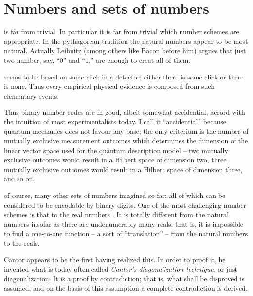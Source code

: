 \begin{center}
{\color{olive}   \Huge
\decofourright
}
\end{center}


\chapter{Numbers and sets of numbers}
\label{ch:n}


 is far from trivial.
In particular it is far from trivial which number schemes are appropriate.
In the pythagorean tradition the natural numbers appear to be most natural.
Actually Leibnitz (among others like Bacon before him) argues that just two number, say, ``$0$'' and ``$1$,'' are enough to creat all of them.

 seems to be based on some click in a detector:
either there is some click or there is none.
Thus every empirical physical evidence is composed from such elementary events.


Thus binary number codes are in good, albeit somewhat accidential, accord with the intuition of most experimentalists today.
I call it ``accidential'' because quantum mechanics
does not favour any base; the only criterium is the number of mutually exclusive measurement outcomes
which determines the dimension of the linear vector space used for the quantum description model --
two mutually exclusive outcomes would result in a Hilbert space of dimension two,
three mutually exclusive outcomes would result in a Hilbert space of dimension three,
and so on.

 of course, many other sets of numbers imagined so far; all of which can be considered to be encodable by binary digits.
One of the most challenging number schemes is that to the real numbers \cite{drobot}.
It is totally different from the natural numbers insofar as there are undenumerably many reals; that is,
it is impossible to find a one-to-one function -- a sort of ``translation'' -- from the natural numbers to the reals.


Cantor appears to be the first having realized this.
In order to proof it, he invented what is today often called
{\em Cantor's diagonalization technique,} or just diagonalization.
It is a proof by contradiction; that is, what shall be disproved is assumed;
and on the basis of this assumption a complete contradiction is derived.

